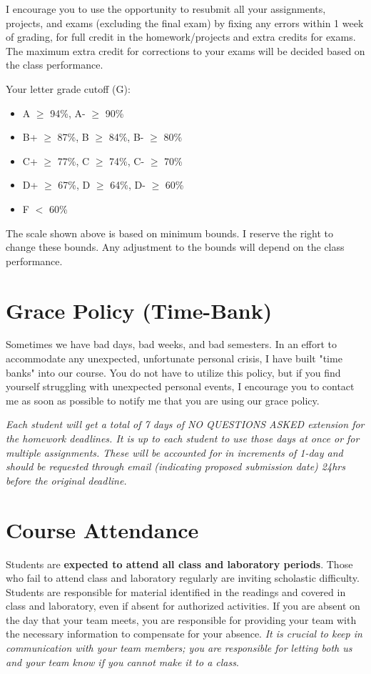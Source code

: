 \documentclass[11pt,fourier]{article}
\begin{document}
I encourage you to use the opportunity to resubmit all your assignments, projects, and exams (excluding the final exam) by fixing any errors within 1 week of grading, for full credit in the homework/projects and extra credits for exams. The maximum extra credit for corrections to your exams will be decided based on the class performance.

Your letter grade cutoff (G): 
\begin{itemize}
    \item A $\ge$ 94\%, A- $\ge$ 90\%
    \item B+ $\ge$ 87\%, B $\ge$ 84\%, B- $\ge$ 80\%
    \item C+ $\ge$ 77\%, C $\ge$ 74\%, C- $\ge$ 70\%
    \item D+ $\ge$ 67\%, D $\ge$ 64\%, D- $\ge$ 60\%
    \item F $<$ 60\%
\end{itemize}

The scale shown above is based on minimum bounds. I reserve the right to change these bounds. Any adjustment to the bounds will depend on the class performance.

\section*{Grace Policy (Time-Bank)}
Sometimes we have bad days, bad weeks, and bad semesters. In an effort to accommodate any unexpected, unfortunate personal crisis, I have built "time banks" into our course. You do not have to utilize this policy, but if you find yourself struggling with unexpected personal events, I encourage you to contact me as soon as possible to notify me that you are using our grace policy.

\textit{Each student will get a total of 7 days of NO QUESTIONS ASKED extension for the homework deadlines. It is up to each student to use those days at once or for multiple assignments. These will be accounted for in increments of 1-day and should be requested through email (indicating proposed submission date) 24hrs before the original deadline.}

\section*{Course Attendance}
Students are \textbf{expected to attend all class and laboratory periods}. Those who fail to attend class and laboratory regularly are inviting scholastic difficulty. Students are responsible for material identified in the readings and covered in class and laboratory, even if absent for authorized activities. If you are absent on the day that your team meets, you are responsible for providing your team with the necessary information to compensate for your absence. \textit{It is crucial to keep in communication with your team members; you are responsible for letting both us and your team know if you cannot make it to a class}.
\end{document}
